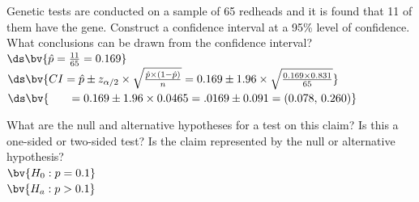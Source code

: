 \documentclass{article}
\begin{document}
\begin{flushleft}
\begin{enumalpha}
\newpage
\item Genetic tests are conducted on a sample of 65 redheads and it is found that 11 of them have the gene. Construct a confidence interval at a 95\% level of confidence. What conclusions can be drawn from the confidence interval?\\
\bigskip
$\ds\bv{\hat p = \frac{11}{65} = 0.169}$\\
\medskip
$\ds \bv{CI = \hat p \pm z_{\alpha/2} \times \sqrt{\frac{\hat p \times (1-\hat p)}{n} } = 0.169 \pm 1.96 \times \sqrt{\frac{0.169 \times 0.831}{65}}}$\\ \medskip
$\ds\bv{\qquad = 0.169 \pm 1.96 \times0.0465 = .0169 \pm 0.091 = (0.078, \, 0.260)}$\\
\bigskip
{}
\vspace{0.5in}

\item What are the null and alternative hypotheses for a test on this claim? Is this a one-sided or two-sided test? Is the claim represented by the null or alternative hypothesis?\\ \medskip
$\bv{H_0: p = 0.1}$\\
$\bv{H_a: p > 0.1}$\\
\\
\vspace{.5in}

\end{enumalpha}



\newpage

\end{flushleft}
\end{document}

